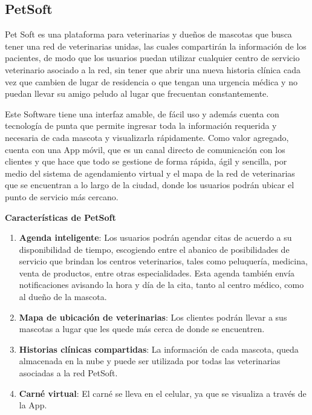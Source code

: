 \subsection{PetSoft}
Pet Soft es una plataforma para veterinarias y dueños de mascotas que busca tener una red de veterinarias unidas, las cuales compartirán la información de los pacientes, de modo que los usuarios puedan utilizar cualquier centro de servicio veterinario asociado a la red, sin tener que abrir una nueva historia clínica cada vez que cambien de lugar de residencia o que tengan una urgencia médica y no puedan llevar  su amigo peludo al lugar que frecuentan constantemente.

Este Software tiene una interfaz amable, de fácil uso y además cuenta con tecnología de punta que permite ingresar toda la información requerida y necesaria de cada mascota y visualizarla rápidamente.  Como valor agregado, cuenta con una App móvil, que es un canal directo de comunicación con los clientes y que hace que todo se gestione de forma rápida, ágil y sencilla, por medio del sistema de agendamiento virtual y el mapa de la red de veterinarias que se encuentran a lo largo de la ciudad, donde los usuarios podrán ubicar el punto de servicio más cercano.
\newline
\newline


\textbf{Características de PetSoft}


\begin{enumerate}
\item	\textbf{Agenda inteligente}: Los usuarios podrán agendar citas de acuerdo a su disponibilidad de tiempo, escogiendo entre el abanico de posibilidades de servicio  que brindan los centros veterinarios, tales como peluquería, medicina, venta de productos, entre otras especialidades.  Esta agenda también envía notificaciones avisando la hora y día de la cita, tanto al centro médico, como al dueño de la mascota.
	
	
	
 \item \textbf{Mapa de ubicación de veterinarias}: Los clientes podrán llevar a sus mascotas a lugar que les quede más cerca de donde se encuentren.
	
	
\item \textbf{Historias clínicas compartidas}: La información de cada mascota, queda almacenada en la nube y puede ser utilizada por todas las veterinarias asociadas a la red PetSoft.
	
	
\item \textbf{Carné virtual}: El carné se lleva en el celular, ya que se visualiza a través de la App.
\end{enumerate}




